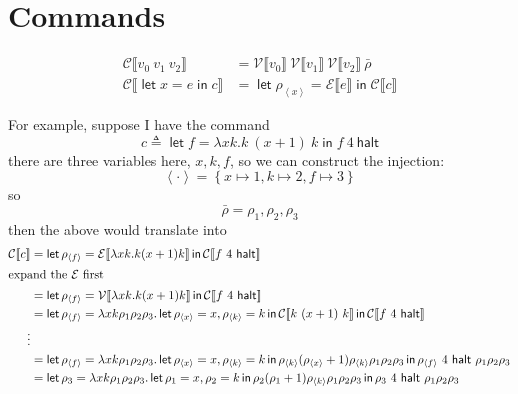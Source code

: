 \documentclass[11pt,a4paper]{article}
\newcommand {\coo} [1] {\ensuremath{\operatorname{\mathsf{#1}}}}
\newcommand{\Let}[1]{\coo{let} #1 \coo{in} }
\newcommand{\Rec}[1]{\left\{#1\right\}}
\newcommand{\ba}[1]{\left\langle #1\right\rangle}
\newcommand{\g}[1]{\textsf{#1}}
\newcommand{\trans}[2]{\ensuremath{\mathcal{#1}\llbracket #2\rrbracket}}
\begin{document}
\section{Commands}
\begin{align*}
\trans{C}{v_0~v_1~v_2} &= \trans{V}{v_0} ~ \trans{V}{v_1} ~ \trans{V}{v_2} ~ \bar\rho \\
\trans{C}{\Let{x = e}{c}} &= \Let{\rho_{\ba{x}} = \trans{E}{e}}{\trans{C}{c}}
\end{align*}

For example, suppose I have the command 
$$
c \triangleq \Let{f = \lambda xk. k~ (x + 1)~k}{f~4~\g{halt}}
$$
there are three variables here, $x,k,f$, so we can construct the injection:
$$
\ba{\cdot} = \Rec{x \mapsto 1, k \mapsto 2, f \mapsto 3}
$$
so
$$
\bar\rho = \rho_1, \rho_2, \rho_3
$$
then the above would translate into
\begin{align*}
\trans{C}{c} &= \Let{\rho_{\ba{f}} = \trans{E}{\lambda xk. k (x + 1)k}}{\trans{C}{f~4~\g{halt}}} \\
\intertext{expand the $\mathcal{E}$ first}
&= \Let{\rho_{\ba{f}} = \trans{V}{\lambda xk. k (x + 1)k}}{\trans{C}{f~4~\g{halt}}} \\
&= \Let{\rho_{\ba{f}} = \lambda xk\rho_1\rho_2\rho_3.\Let{\rho_{\ba{x}} = x,\rho_{\ba{k}} = k}{\trans{C}{k~(x + 1)~k}}}{\trans{C}{f~4~\g{halt}}} \\
\vdots \\
&= \Let{\rho_{\ba{f}} = \lambda xk\rho_1\rho_2\rho_3.\Let{\rho_{\ba{x}} = x,\rho_{\ba{k}} = k}{\rho_{\ba{k}}(\rho_{\ba{x}} + 1)\rho_{\ba{k}}\rho_1\rho_2\rho_3}}{{\rho_{\ba{f}}~4~\g{halt}~\rho_1\rho_2\rho_3}} \\
&=\Let{\rho_{3} = \lambda xk\rho_1\rho_2\rho_3.\Let{\rho_{1} = x,\rho_{2} = k}{\rho_{2}(\rho_{1} + 1)\rho_{\ba{k}}\rho_1\rho_2\rho_3}}{{\rho_{3}~4~\g{halt}~\rho_1\rho_2\rho_3}}
\end{align*}
\end{document}
